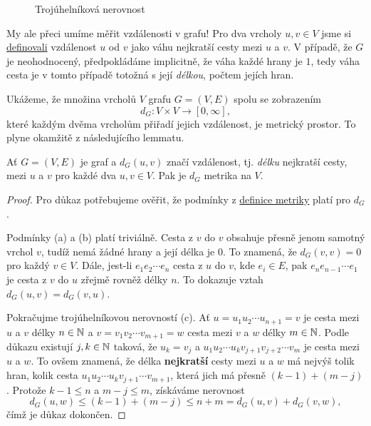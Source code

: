 \begin{figure}[h]
 \centering

 \caption{Trojúhelníková nerovnost}
 \label{fig:trojuhelnikova-nerovnost}
\end{figure}

My ale přeci umíme měřit vzdálenosti v grafu! Pro dva vrcholy $u,v \in V$ jsme
si \hyperref[def:vzdalenost-v-grafu]{definovali} vzdálenost $u$ od $v$ jako váhu
nejkratší cesty mezi $u$ a $v$. V případě, že $G$ je neohodnocený, předpokládáme
implicitně, že váha každé hrany je $1$, tedy váha cesta je v tomto případě
totožná s její \emph{délkou}, počtem jejích hran.

Ukážeme, že množina vrcholů $V$ grafu $G = (V,E)$ spolu se zobrazením
\[
 d_G:V \times V \to [0,\infty],
\]
které každým dvěma vrcholům přiřadí jejich vzdálenost, je metrický prostor. To
plyne okamžitě z následujícího lemmatu.

\begin{lemma}
 \label{lem:vzdalenost-je-metrika}
 Ať $G = (V,E)$ je graf a $d_G(u,v)$ značí vzdálenost, tj. \emph{délku}
 nejkratší cesty, mezi $u$ a $v$ pro každé dva $u,v \in V$. Pak je $d_G$ metrika
 na $V$.
\end{lemma}
\begin{proof}
 Pro důkaz potřebujeme ověřit, že podmínky z \hyperref[def:metrika]{definice
 metriky} platí pro $d_G$.

 Podmínky (a) a (b) platí triviálně. Cesta z $v$ do $v$ obsahuje přesně jenom
 samotný vrchol $v$, tudíž nemá žádné hrany a její délka je $0$. To znamená, že
 $d_G(v,v) = 0$ pro každý $v \in V$. Dále, jest-li $e_1e_2\cdots e_n$ cesta z
 $u$ do $v$, kde $e_i \in E$, pak $e_ne_{n-1}\cdots e_1$ je cesta z $v$ do $u$
 zřejmě rovněž délky $n$. To dokazuje vztah $d_G(u,v) = d_G(v,u)$.

 Pokračujme trojúhelníkovou nerovností (c). Ať $u = u_1u_2\cdots u_{n+1} = v$ je
 cesta mezi $u$ a $v$ délky $n \in \mathbb{N}$ a $v = v_1v_2\cdots v_{m+1} = w$ cesta
 mezi $v$ a $w$ délky $m \in \mathbb{N}$. Podle důkazu
  existují $j,k \in \mathbb{N}$ taková, že $u_k =
 v_j$ a $u_1u_2\cdots u_kv_{j+1}v_{j+2}\cdots v_m$ je cesta mezi $u$ a $w$. To
 ovšem znamená, že délka \textbf{nejkratší} cesty mezi $u$ a $w$ má nejvýš tolik
 hran, kolik cesta $u_1u_2\cdots u_kv_{j+1}\cdots v_{m+1}$, která jich má přesně
 $(k - 1) + (m - j)$. Protože $k - 1 \leq n$ a $m - j \leq m$, získáváme
 nerovnost
 \[
  d_G(u,w) \leq (k - 1) + (m - j) \leq n + m = d_G(u,v) + d_G(v,w),
 \]
 čímž je důkaz dokončen.
\end{proof}

